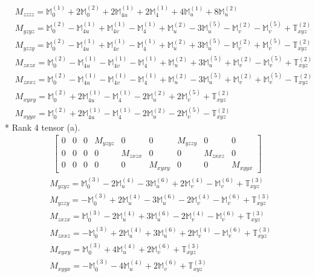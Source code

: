 \documentclass[fleqn,8pt,landscape]{jsarticle}
\begin{document}
\begin{align*}
& M_{zzzz} = \mathbb{M}_{0}^{(1)} + 2 \mathbb{M}_{0}^{(2)} + 2 \mathbb{M}_{4u}^{(1)} + 2 \mathbb{M}_{4}^{(1)} + 4 \mathbb{M}_{u}^{(1)} + 8 \mathbb{M}_{u}^{(2)} \\
& M_{yzyz} = \mathbb{M}_{0}^{(2)} - \mathbb{M}_{4u}^{(1)} + \mathbb{M}_{4v}^{(1)} - \mathbb{M}_{4}^{(1)} + \mathbb{M}_{u}^{(2)} - 3 \mathbb{M}_{u}^{(5)} - \mathbb{M}_{v}^{(2)} - \mathbb{M}_{v}^{(5)} + \mathbb{T}_{xyz}^{(2)} \\
& M_{yzzy} = \mathbb{M}_{0}^{(2)} - \mathbb{M}_{4u}^{(1)} + \mathbb{M}_{4v}^{(1)} - \mathbb{M}_{4}^{(1)} + \mathbb{M}_{u}^{(2)} + 3 \mathbb{M}_{u}^{(5)} - \mathbb{M}_{v}^{(2)} + \mathbb{M}_{v}^{(5)} - \mathbb{T}_{xyz}^{(2)} \\
& M_{zxzx} = \mathbb{M}_{0}^{(2)} - \mathbb{M}_{4u}^{(1)} - \mathbb{M}_{4v}^{(1)} - \mathbb{M}_{4}^{(1)} + \mathbb{M}_{u}^{(2)} + 3 \mathbb{M}_{u}^{(5)} + \mathbb{M}_{v}^{(2)} - \mathbb{M}_{v}^{(5)} + \mathbb{T}_{xyz}^{(2)} \\
& M_{zxxz} = \mathbb{M}_{0}^{(2)} - \mathbb{M}_{4u}^{(1)} - \mathbb{M}_{4v}^{(1)} - \mathbb{M}_{4}^{(1)} + \mathbb{M}_{u}^{(2)} - 3 \mathbb{M}_{u}^{(5)} + \mathbb{M}_{v}^{(2)} + \mathbb{M}_{v}^{(5)} - \mathbb{T}_{xyz}^{(2)} \\
& M_{xyxy} = \mathbb{M}_{0}^{(2)} + 2 \mathbb{M}_{4u}^{(1)} - \mathbb{M}_{4}^{(1)} - 2 \mathbb{M}_{u}^{(2)} + 2 \mathbb{M}_{v}^{(5)} + \mathbb{T}_{xyz}^{(2)} \\
& M_{xyyx} = \mathbb{M}_{0}^{(2)} + 2 \mathbb{M}_{4u}^{(1)} - \mathbb{M}_{4}^{(1)} - 2 \mathbb{M}_{u}^{(2)} - 2 \mathbb{M}_{v}^{(5)} - \mathbb{T}_{xyz}^{(2)}
\end{align*}
* Rank 4 tensor (a).
\begin{align*}
\begin{bmatrix} 0 & 0 & 0 & M_{yzyz} & 0 & 0 & M_{yzzy} & 0 & 0 \\ 0 & 0 & 0 & 0 & M_{zxzx} & 0 & 0 & M_{zxxz} & 0 \\ 0 & 0 & 0 & 0 & 0 & M_{xyxy} & 0 & 0 & M_{xyyx} \end{bmatrix}
\end{align*}
\begin{align*}
& M_{yzyz} = \mathbb{M}_{0}^{(3)} - 2 \mathbb{M}_{u}^{(4)} - 3 \mathbb{M}_{u}^{(6)} + 2 \mathbb{M}_{v}^{(4)} - \mathbb{M}_{v}^{(6)} + \mathbb{T}_{xyz}^{(3)} \\
& M_{yzzy} = - \mathbb{M}_{0}^{(3)} + 2 \mathbb{M}_{u}^{(4)} - 3 \mathbb{M}_{u}^{(6)} - 2 \mathbb{M}_{v}^{(4)} - \mathbb{M}_{v}^{(6)} + \mathbb{T}_{xyz}^{(3)} \\
& M_{zxzx} = \mathbb{M}_{0}^{(3)} - 2 \mathbb{M}_{u}^{(4)} + 3 \mathbb{M}_{u}^{(6)} - 2 \mathbb{M}_{v}^{(4)} - \mathbb{M}_{v}^{(6)} + \mathbb{T}_{xyz}^{(3)} \\
& M_{zxxz} = - \mathbb{M}_{0}^{(3)} + 2 \mathbb{M}_{u}^{(4)} + 3 \mathbb{M}_{u}^{(6)} + 2 \mathbb{M}_{v}^{(4)} - \mathbb{M}_{v}^{(6)} + \mathbb{T}_{xyz}^{(3)} \\
& M_{xyxy} = \mathbb{M}_{0}^{(3)} + 4 \mathbb{M}_{u}^{(4)} + 2 \mathbb{M}_{v}^{(6)} + \mathbb{T}_{xyz}^{(3)} \\
& M_{xyyx} = - \mathbb{M}_{0}^{(3)} - 4 \mathbb{M}_{u}^{(4)} + 2 \mathbb{M}_{v}^{(6)} + \mathbb{T}_{xyz}^{(3)}
\end{align*}
\end{document}
